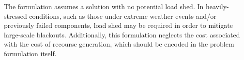 The \CSCED{} formulation assumes a solution with no potential load shed. In heavily-stressed conditions, such as those under extreme weather events and/or previously failed components, load shed may be required in order to mitigate large-scale blackouts. Additionally, this formulation neglects the cost associated with the cost of recourse generation, which should be encoded in the problem formulation itself.


